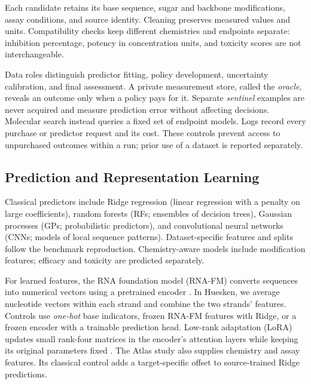\documentclass[letterpaper]{article}
\begin{document}
Each candidate retains its base sequence, sugar and backbone modifications, assay conditions, and source identity. Cleaning preserves measured values and units. Compatibility checks keep different chemistries and endpoints separate: inhibition percentage, potency in concentration units, and toxicity scores are not interchangeable.

Data roles distinguish predictor fitting, policy development, uncertainty calibration, and final assessment. A private measurement store, called the \emph{oracle}, reveals an outcome only when a policy pays for it. Separate \emph{sentinel} examples are never acquired and measure prediction error without affecting decisions. Molecular search instead queries a fixed set of endpoint models. Logs record every purchase or predictor request and its cost. These controls prevent access to unpurchased outcomes within a run; prior use of a dataset is reported separately.

\subsection{Prediction and Representation Learning}
Classical predictors include Ridge regression (linear regression with a penalty on large coefficients), random forests (RFs; ensembles of decision trees), Gaussian processes (GPs; probabilistic predictors), and convolutional neural networks (CNNs; models of local sequence patterns). Dataset-specific features and splits follow the benchmark reproduction. Chemistry-aware models include modification features; efficacy and toxicity are predicted separately.

For learned features, the RNA foundation model (RNA-FM) converts sequences into numerical vectors using a pretrained encoder \citep{rnafm}. In Huesken, we average nucleotide vectors within each strand and combine the two strands' features. Controls use \emph{one-hot} base indicators, frozen RNA-FM features with Ridge, or a frozen encoder with a trainable prediction head. Low-rank adaptation (LoRA) updates small rank-four matrices in the encoder's attention layers while keeping its original parameters fixed \citep{lora}. The Atlas study also supplies chemistry and assay features. Its classical control adds a target-specific offset to source-trained Ridge predictions.
\end{document}
